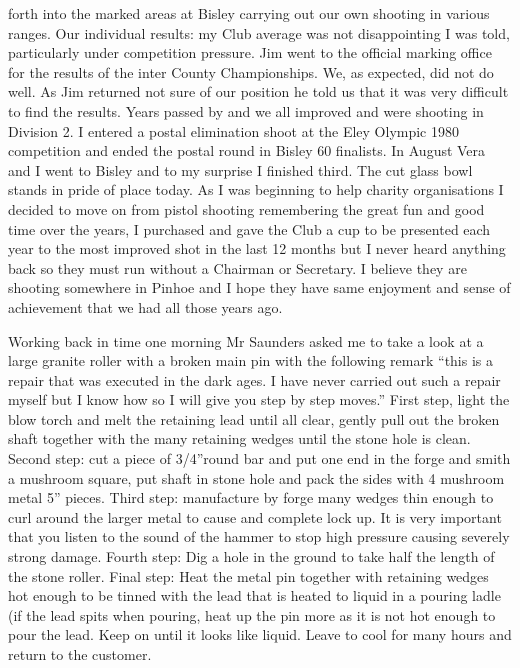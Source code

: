 forth into the marked areas at Bisley carrying out our own shooting in various
ranges. Our individual results: my Club average was not disappointing I was
told, particularly under competition pressure. Jim went to the official marking
office for the results of the inter County Championships. We, as expected, did
not do well. As Jim returned not sure of our position he told us that it was
very difficult to find the results. Years passed by and we all improved and
were shooting in Division 2. I entered a postal elimination shoot at the Eley
Olympic 1980 competition and ended the postal round in Bisley 60 finalists. In
August Vera and I went to Bisley and to my surprise I finished third. The cut
glass bowl stands in pride of place today. As I was beginning to help charity
organisations I decided to move on from pistol shooting remembering the great
fun and good time over the years, I purchased and gave the Club a cup to be
presented each year to the most improved shot in the last 12 months but I never
heard anything back so they must run without a Chairman or Secretary. I believe
they are shooting somewhere in Pinhoe and I hope they have same enjoyment and
sense of achievement that we had all those years ago.

Working back in time one morning Mr Saunders asked me to take a look at a large
granite roller with a broken main pin with the following remark ``this is a
repair that was executed in the dark ages. I have never carried out such a
repair myself but I know how so I will give you step by step moves.'' First
step, light the blow torch and melt the retaining lead until all clear, gently
pull out the broken shaft together with the many retaining wedges until the
stone hole is clean. Second step: cut a piece of 3/4''round bar and put one end
in the forge and smith a mushroom square, put shaft in stone hole and pack the
sides with 4 mushroom metal 5'' pieces. Third step: manufacture by forge many
wedges thin enough to curl around the larger metal to cause and complete lock
up. It is very important that you listen to the sound of the hammer to stop
high pressure causing severely strong damage. Fourth step: Dig a hole in the
ground to take half the length of the stone roller. Final step: Heat the metal
pin together with retaining wedges hot enough to be tinned with the lead that
is heated to liquid in a pouring ladle (if the lead spits when pouring, heat up
the pin more as it is not hot enough to pour the lead. Keep on until it looks
like liquid. Leave to cool for many hours and return to the customer.

